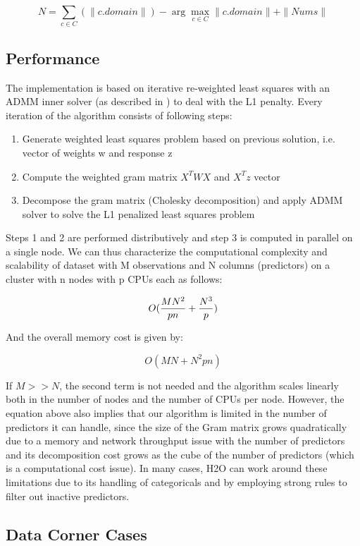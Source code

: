 $$N = \sum_{c \in C} (\|c.domain\|) - \arg\max_{c \in C} \|c.domain\| + \|Nums\| $$

\subsection{Performance}

The implementation is based on iterative re-weighted least squares with an ADMM inner solver (as described
in ) to deal with the L1 penalty. Every iteration of the algorithm consists of following steps:

\begin{enumerate} 
\item Generate weighted least squares problem based on previous solution, i.e. vector of weights w and response z 
\item Compute the weighted gram matrix $X^TWX$ and $X^Tz$ vector
\item Decompose the gram matrix (Cholesky decomposition) and apply ADMM solver to solve the L1 penalized least squares problem
\end{enumerate}

Steps 1 and 2 are performed distributively and step 3 is computed in parallel on a single node. We can thus
characterize the computational complexity and scalability of dataset with M observations and N columns (predictors)
on a cluster with n nodes with p CPUs each as follows:

\[ O({MN^2 \over pn} + {N^3 \over p})\]

And the overall memory cost is given by:

\[ O(MN + N^2pn)\]

If $M >> N$, the second term is not needed and the algorithm scales linearly both in the number of nodes and the
number of CPUs per node. However, the equation above also implies that our algorithm is limited in the number of
predictors it can handle, since the size of the Gram matrix grows quadratically due to a memory and network
throughput issue with the number of predictors and its decomposition cost grows as the cube of the number of
predictors (which is a computational cost issue). In many cases, H2O can work around these limitations due to its
handling of categoricals and by employing strong rules to filter out inactive predictors.

\subsection{Data Corner Cases}

